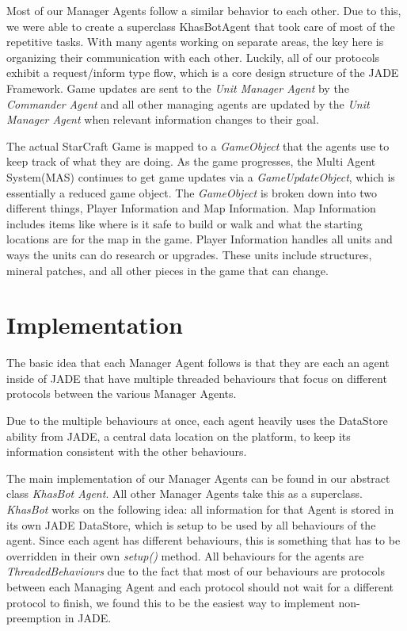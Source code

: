 \documentclass[letterpaper]{article}
\begin{document}
Most of our Manager Agents follow a similar behavior to each other. Due to this, we were able to create a superclass KhasBotAgent that took care of most of the repetitive tasks.  With many agents working on separate areas, the key here is organizing their communication with each other.  Luckily, all of our protocols exhibit a request/inform type flow, which is a core design structure of the JADE Framework.  Game updates are sent to the \emph{Unit Manager Agent} by the \emph{Commander Agent} and all other managing agents are updated by the \emph{Unit Manager Agent} when relevant information changes to their goal.

The actual StarCraft Game is mapped to a \emph{GameObject} that the agents use to keep track of what they are doing.  As the game progresses, the Multi Agent System(MAS) continues to get game updates via a \emph{GameUpdateObject}, which is essentially a reduced game object.  The \emph{GameObject} is broken down into two different things, Player Information and Map Information. Map Information includes items like where is it safe to build or walk and what the starting locations are for the map in the game.  Player Information handles all units and ways the units can do research or upgrades.  These units include structures, mineral patches, and all other pieces in the game that can change.

\section{Implementation}
The basic idea that each Manager Agent follows is that they are each an agent inside of JADE that have multiple threaded behaviours that focus on different protocols between the various Manager Agents.

Due to the multiple behaviours at once, each agent heavily uses the DataStore ability from JADE, a central data location on the platform, to keep its information consistent with the other behaviours.

The main implementation of our Manager Agents can be found in our abstract class \emph{KhasBot Agent}. All other Manager Agents take this as a superclass. \emph{KhasBot} works on the following idea: all information for that Agent is stored in its own JADE DataStore, which is setup to be used by all behaviours of the agent. Since each agent has different behaviours, this is something that has to be overridden in their own \emph{setup()} method. All behaviours for the agents are \emph{ThreadedBehaviours} due to the fact that most of our behaviours are protocols between each Managing Agent and each protocol should not wait for a different protocol to finish, we found this to be the easiest way to implement non-preemption in JADE.
\end{document}
